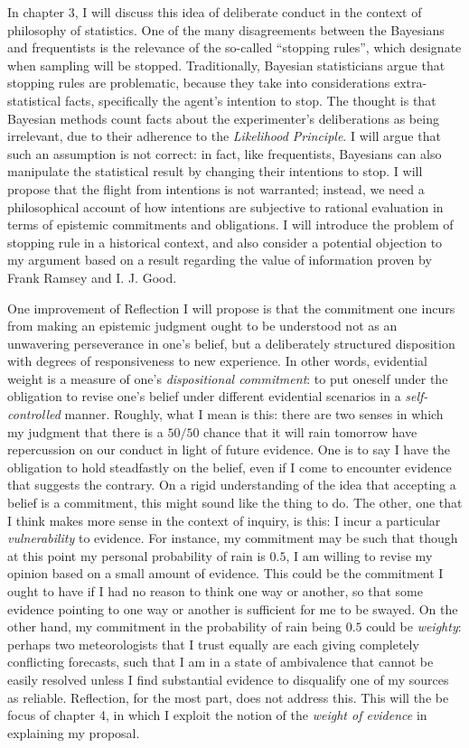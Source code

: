 In chapter 3, I will discuss this idea of deliberate conduct in the
context of philosophy of statistics. One of the many disagreements
between the Bayesians and frequentists is the relevance of the so-called
``stopping rules'', which designate when sampling will be stopped.
Traditionally, Bayesian statisticians argue that stopping rules are
problematic, because they take into considerations extra-statistical
facts, specifically the agent's intention to stop. The thought is
that Bayesian methods count facts about the
experimenter's deliberations as being irrelevant, due to their adherence to the \emph{Likelihood
Principle}. I will argue that such an assumption is not correct: in
fact, like frequentists, Bayesians can also manipulate the statistical
result by changing their intentions to stop. I will propose that the
flight from intentions is not warranted; instead, we need a
philosophical account of how intentions are subjective to rational
evaluation in terms of epistemic commitments and obligations. I will
introduce the problem of stopping rule in a historical context, and also consider a potential
objection to my argument based on a result regarding the value of
information proven by Frank Ramsey and I. J. Good.

One improvement of Reflection I will propose is that the commitment one
incurs from making an epistemic judgment ought to be understood not as
an unwavering perseverance in one's belief, but a deliberately structured disposition with
degrees of responsiveness to new experience. In other words, evidential
weight is a measure of one's \emph{dispositional commitment}: to put
oneself under the obligation to revise one's belief under different
evidential scenarios in a \emph{self-controlled} manner. Roughly, what I
mean is this: there are two senses in which my judgment that there is
a \(50/50\) chance that it will rain tomorrow have repercussion on our conduct in light of future evidence. One
is to say I have the obligation to hold steadfastly on the belief, even
if I come to encounter evidence that suggests the contrary. On a rigid
understanding of the idea that accepting a belief is a commitment, this
might sound like the thing to do. The other, one that I think makes more
sense in the context of inquiry, is this: I incur a particular
\emph{vulnerability} to evidence. For instance, my commitment may be
such that though at this point my personal probability of rain is
\(0.5\), I am willing to revise my opinion based on a small amount of
evidence. This could be the commitment I ought to have if I had no reason to
think one way or another, so that some evidence pointing to one way or
another is sufficient for me to be swayed. On the other hand, my
commitment in the probability of rain being \(0.5\) could be
\emph{weighty}: perhaps two meteorologists that I trust equally are each
giving completely conflicting forecasts, such that I am in a state of
ambivalence that cannot be easily resolved unless I find substantial
evidence to disqualify one of my sources as reliable. Reflection, for
the most part, does not address this. This will the be focus of chapter
4, in which I exploit the notion of the \emph{weight of evidence} in
explaining my proposal.

